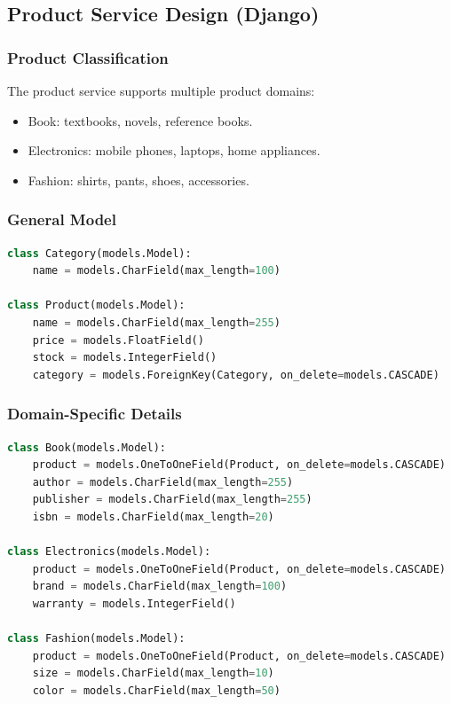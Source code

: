 \documentclass[12pt,a4paper]{article}
\begin{document}
\subsection{Product Service Design (Django)}

\subsubsection{Product Classification}

The product service supports multiple product domains:

\begin{itemize}
    \item Book: textbooks, novels, reference books.
    \item Electronics: mobile phones, laptops, home appliances.
    \item Fashion: shirts, pants, shoes, accessories.
\end{itemize}

\subsubsection{General Model}

\begin{lstlisting}[language=Python,caption={General product model.}]
class Category(models.Model):
    name = models.CharField(max_length=100)

class Product(models.Model):
    name = models.CharField(max_length=255)
    price = models.FloatField()
    stock = models.IntegerField()
    category = models.ForeignKey(Category, on_delete=models.CASCADE)
\end{lstlisting}

\subsubsection{Domain-Specific Details}

\begin{lstlisting}[language=Python,caption={Domain-specific product extensions.}]
class Book(models.Model):
    product = models.OneToOneField(Product, on_delete=models.CASCADE)
    author = models.CharField(max_length=255)
    publisher = models.CharField(max_length=255)
    isbn = models.CharField(max_length=20)

class Electronics(models.Model):
    product = models.OneToOneField(Product, on_delete=models.CASCADE)
    brand = models.CharField(max_length=100)
    warranty = models.IntegerField()

class Fashion(models.Model):
    product = models.OneToOneField(Product, on_delete=models.CASCADE)
    size = models.CharField(max_length=10)
    color = models.CharField(max_length=50)
\end{lstlisting}
\end{document}
